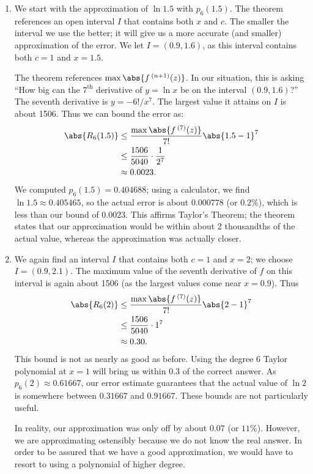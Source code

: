 {\begin{enumerate}
\item	We start with the approximation of $\ln 1.5$ with $p_6(1.5)$. The theorem references an open interval $I$ that contains both $x$ and $c$. The smaller the interval we use the better; it will give us a more accurate (and smaller) approximation of the error. We let $I = (0.9,1.6)$, as this interval contains both $c=1$ and $x=1.5$. 

The theorem references $\max\abs{f\,^{(n+1)}(z)}$. In our situation, this is asking ``How big can the $7^\text{th}$ derivative of $y=\ln x$ be on the interval $(0.9,1.6)$?'' The seventh derivative is $y = -6!/x^7$. The largest value it attains on $I$ is about 1506. Thus we can bound the error as:
\begin{align*}
	\abs{R_6(1.5)}
	&\leq \frac{\max\abs{f\,^{(7)}(z)}}{7!}\abs{1.5-1}^7\\
	&\leq \frac{1506}{5040}\cdot\frac1{2^7}\\
	&\approx 0.0023.
\end{align*}
We computed $p_6(1.5) = 0.404688$; using a calculator, we find $\ln 1.5 \approx 0.405465$, so the actual error is about $0.000778$ (or $0.2\%$), which is less than our bound of $0.0023$. This affirms Taylor's Theorem; the theorem states that our approximation would be within about 2 thousandths of the actual value, whereas the approximation was actually closer.

	\item	We again find an interval $I$ that contains both $c=1$ and $x=2$; we choose $I = (0.9,2.1)$. The maximum value of the seventh derivative of $f$ on this interval is again about 1506 (as the largest values come near $x=0.9$). Thus 
\begin{align*}
	\abs{R_6(2)}
	&\leq \frac{\max\abs{f\,^{(7)}(z)}}{7!}\abs{2-1}^7\\
	&\leq \frac{1506}{5040}\cdot1^7\\
	&\approx 0.30.
\end{align*}
This bound is not as nearly as good as before. Using the degree 6 Taylor polynomial at $x =1$ will bring us within 0.3 of the correct answer. As $p_6(2)\approx 0.61667$, our error estimate guarantees that the actual value of $\ln 2$ is somewhere between $0.31667$ and $0.91667$. These bounds are not particularly useful.

In reality, our approximation was only off by about $0.07$ (or $11\%$). However, we are approximating ostensibly because we do not know the real answer. In order to be assured that we have a good approximation, we would have to resort to using a polynomial of higher degree.\eoehere
\end{enumerate}}


